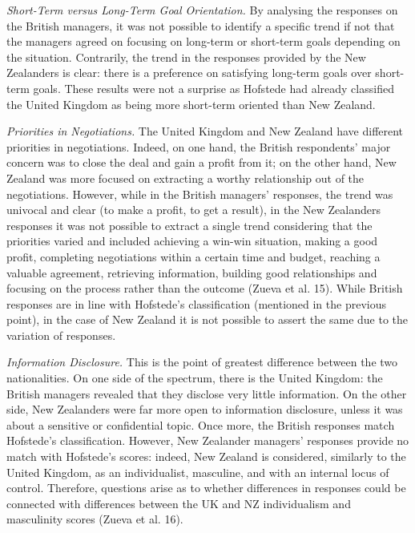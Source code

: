 \documentclass[../main.tex]{subfiles}
\begin{document}
\textit{Short-Term versus Long-Term Goal Orientation.} By analysing the responses on the British managers, it was not possible to identify a specific trend if not that the managers agreed on focusing on long-term or short-term goals depending on the situation. Contrarily, the trend in the responses provided by the New Zealanders is clear: there is a preference on satisfying long-term goals over short-term goals. These results were not a surprise as Hofstede had already classified the United Kingdom as being more short-term oriented than New Zealand.

\textit{Priorities in Negotiations.} The United Kingdom and New Zealand have different priorities in negotiations. Indeed, on one hand, the British respondents' major concern was to close the deal and gain a profit from it; on the other hand, New Zealand was more focused on extracting a worthy relationship out of the negotiations. However, while in the British managers' responses, the trend was univocal and clear (to make a profit, to get a result), in the New Zealanders responses it was not possible to extract a single trend considering that the priorities varied and included achieving a win-win situation, making a good profit, completing negotiations within a certain time and budget, reaching a valuable agreement, retrieving information, building good relationships and focusing on the process rather than the outcome (Zueva et al. 15). While British responses are in line with Hofstede's classification (mentioned in the previous point), in the case of New Zealand it is not possible to assert the same due to the variation of responses.

\textit{Information Disclosure.} This is the point of greatest difference between the two nationalities. On one side of the spectrum, there is the United Kingdom: the British managers revealed that they disclose very little information. On the other side, New Zealanders were far more open to information disclosure, unless it was about a sensitive or confidential topic. Once more, the British responses match Hofstede's classification. However, New Zealander managers' responses provide no match with Hofstede's scores: indeed, New Zealand is considered, similarly to the United Kingdom, as an individualist, masculine, and with an internal locus of control. Therefore, questions arise as to whether differences in responses could be connected with differences between the UK and NZ individualism and masculinity scores (Zueva et al. 16).
\end{document}
